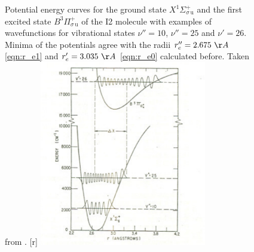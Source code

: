 \begin{figure}[!t]
  \begin{captionbeside}[]{Potential energy curves for the ground state 
    $X ^1\Sigma_{\sigma \, \mathrm{u}}^{+}$ and the first excited state 
    $B ^3\Pi_{\sigma \, \mathrm{u}}^{+}$ of the I2 molecule with examples 
    of wavefunctions for vibrational states $\nu'' = 10$, $\nu'' = 25$ and 
    $\nu' = 26$. Minima of the potentials agree with the radii 
    $r_e'' = 2.675\ \AA$ \eqref{eqn:r_e1} and 
    $r_e'  = 3.035\ \AA$ \eqref{eqn:r_e0} calculated before. 
    Taken from \cite{zare1964calculation}.
    }[r]
    \includegraphics[width=0.65\textwidth]{pics/i2_pot.pdf}
  \end{captionbeside}
    \label{fig:i2_pot}
\end{figure}
\FloatBarrier
